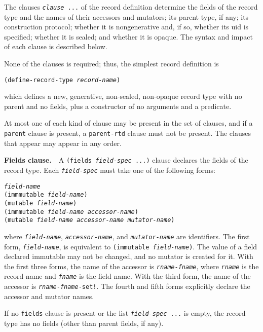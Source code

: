 The clauses \texttt{\textit{clause} ...} of the record definition determine
the fields of the record type and the names of their accessors
and mutators; its parent type, if any; its construction protocol; whether
it is nongenerative and, if so, whether its uid is specified; whether
it is sealed; and whether it is opaque.
The syntax and impact of each clause is described below.


None of the clauses is required; thus, the simplest record definition is


\texttt{(define-record-type \textit{record-name})}

which defines a new, generative, non-sealed, non-opaque record type with no parent
and no fields, plus a constructor of no arguments and a predicate.


At most one of each kind of clause may be present in the set of clauses, and
if a \texttt{parent} clause is present, a \texttt{parent-rtd} clause must not
be present.
The clauses that appear may appear in any order.



\textbf{Fields clause.}  A \texttt{(fields \textit{field-spec} ...)} clause
declares the fields of the record type.
Each \texttt{\textit{field-spec}} must take one of the following forms:


\begin{alltt}
\textit{field-name}
(immmutable \textit{field-name})
(mutable \textit{field-name})
(immmutable \textit{field-name} \textit{accessor-name})
(mutable \textit{field-name} \textit{accessor-name} \textit{mutator-name})
\end{alltt}


where \texttt{\textit{field-name}}, \texttt{\textit{accessor-name}}, and \texttt{\textit{mutator-name}} are identifiers.
The first form, \texttt{\textit{field-name}}, is equivalent to \texttt{(immutable \textit{field-name})}.
The value of a field declared immutable may not be changed, and no mutator is
created for it.
With the first three forms, the name of the accessor is
\texttt{\textit{rname}-\textit{fname}}, where \texttt{\textit{rname}} is the record
name and \texttt{\textit{fname}} is the field name.
With the third form, the name of the accessor is
\texttt{\textit{rname}-\textit{fname}-set!}.
The fourth and fifth forms explicitly declare the accessor and mutator names.


If no \texttt{fields} clause is present or the list \texttt{\textit{field-spec} ...}
is empty, the record type has no fields (other than parent fields, if any).




